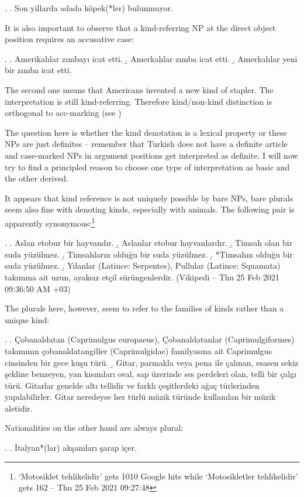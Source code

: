 \documentclass[11pt,a4paper]{article}
\begin{document}
\ex.
\a. Son yillarda adada köpek(*ler) bulunmuyor.



It is also important to observe that a kind-referring NP at the direct object position requires an accusative case:

\ex.
\a. Amerikalılar zımbayı icat etti.
\b. Amerkalılar zımba icat etti.
\b. Amerkalılar yeni bir zımba icat etti.

The second one means that Americans invented a new kind of stapler. The interpretation is still kind-referring. Therefore kind/non-kind distinction is orthogonal to acc-marking (see )

The question here is whether the kind denotation is a lexical property or these NPs are just definites -- remember that Turkish does not have a definite article and case-marked NPs in argument positions get interpreted as definite. I will now try to find a principled reason to choose one type of interpretation as basic and the other derived.

It appears that kind reference is not uniquely possible by bare NPs, bare plurals seem also fine with denoting kinds, especially with animals. The following pair is apparently synonymous:\footnote{`Motosiklet tehlikelidir' gets 1010 Google hits while `Motosikletler tehlikelidir' gets 162 -- Thu 25 Feb 2021 09:27:48}


\ex.
\a. Aslan etobur bir hayvandır.
\b. Aslanlar etobur hayvanlardır.
\b. Timsah olan bir suda yüzülmez.
\b. Timsahların olduğu bir suda yüzülmez.
\b. *Timsahın olduğu bir suda yüzülmez.
\b. Yılanlar (Latince: Serpentes), Pullular (Latince: Squamata) takımına ait uzun, ayaksız etçil sürüngenlerdir. (Vikipedi -- Thu 25 Feb 2021 09:36:50 AM +03)

The plurals here, however, seem to refer to the families of kinds rather than a unique kind:

\ex.
\a. Çobanaldatan (Caprimulgus europaeus), Çobanaldatanlar (Caprimulgiformes) takımının çobanaldatangiller (Caprimulgidae) familyasına ait Caprimulgus cinsinden bir gece kuşu türü.
\b. Gitar, parmakla veya pena ile çalınan, esasen sekiz şekline benzeyen, yan kısımları oval, sap üzerinde ses perdeleri olan, telli bir çalgı türü. Gitarlar genelde altı tellidir ve farklı çeşitlerdeki ağaç türlerinden yapılabilirler. Gitar neredeyse her türlü müzik türünde kullanılan bir müzik aletidir. 


Nationalities on the other hand are always plural:

\ex.
\a. İtalyan*(lar) akşamları şarap içer.
\end{document}
